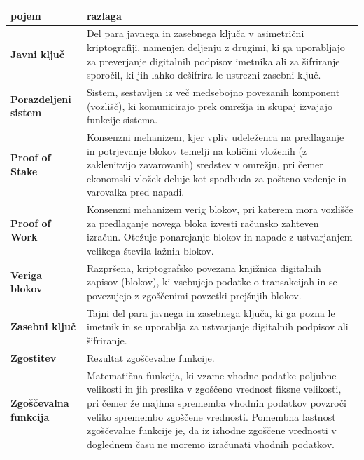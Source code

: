 \newpage
\markboth{}{}
\begin{table}[ht]
  \centering
  \small
  \setlength{\tabcolsep}{6pt} %
  \begin{tabularx}{1\textwidth} { 
  >{\raggedright\arraybackslash}p{}|
  >{\raggedright\arraybackslash}X}
    \textbf{pojem} & \textbf{razlaga} \\ \hline \hline

    \textbf{Javni ključ} &
    Del para javnega in zasebnega ključa v asimetrični kriptografiji, namenjen deljenju z drugimi, ki ga uporabljajo za preverjanje digitalnih podpisov imetnika ali za šifriranje sporočil, ki jih lahko dešifrira le ustrezni zasebni ključ. \\ \hline
    \textbf{Porazdeljeni sistem} &
    Sistem, sestavljen iz več medsebojno povezanih komponent (vozlišč), ki komunicirajo prek omrežja in skupaj izvajajo funkcije sistema. \\ \hline
    \textbf{Proof of Stake} &
    Konsenzni mehanizem, kjer vpliv udeleženca na predlaganje in potrjevanje blokov temelji na količini vloženih (z zaklenitvijo zavarovanih) sredstev v omrežju, pri čemer ekonomski vložek deluje kot spodbuda za pošteno vedenje in varovalka pred napadi. \\ \hline
    \textbf{Proof of Work} &
    Konsenzni mehanizem verig blokov, pri katerem mora vozlišče za predlaganje novega bloka izvesti računsko zahteven izračun. Otežuje ponarejanje blokov in napade z ustvarjanjem velikega števila lažnih blokov. \\ \hline

    \textbf{Veriga blokov} &
    Razpršena, kriptografsko povezana knjižnica digitalnih zapisov (blokov), ki vsebujejo podatke o transakcijah in se povezujejo z zgoščenimi povzetki prejšnjih blokov. \\ \hline

    \textbf{Zasebni ključ} &
    Tajni del para javnega in zasebnega ključa, ki ga pozna le imetnik in se uporablja za ustvarjanje digitalnih podpisov ali šifriranje. \\ \hline

    \textbf{Zgostitev} &
    Rezultat zgoščevalne funkcije. \\ \hline

    \textbf{Zgoščevalna funkcija} &
    Matematična funkcija, ki vzame vhodne podatke poljubne velikosti in jih preslika v zgoščeno vrednost fiksne velikosti, pri čemer že majhna sprememba vhodnih podatkov povzroči veliko spremembo zgoščene vrednosti. Pomembna lastnost zgoščevalne funkcije je, da iz izhodne zgoščene vrednosti v doglednem času ne moremo izračunati vhodnih podatkov. \\

  \end{tabularx}
\end{table}